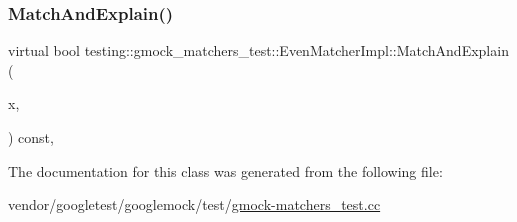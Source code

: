 \subsubsection{\texorpdfstring{Match\+And\+Explain()}{MatchAndExplain()}}
{\footnotesize\ttfamily virtual bool testing\+::gmock\+\_\+matchers\+\_\+test\+::\+Even\+Matcher\+Impl\+::\+Match\+And\+Explain (\begin{DoxyParamCaption}\item[{int}]{x,  }\item[{\hyperlink{classtesting_1_1_match_result_listener}{Match\+Result\+Listener} $\ast$}]{ }\end{DoxyParamCaption}) const\hspace{0.3cm}{\ttfamily [inline]}, {\ttfamily [virtual]}}



The documentation for this class was generated from the following file\+:\begin{DoxyCompactItemize}
\item 
vendor/googletest/googlemock/test/\hyperlink{gmock-matchers__test_8cc}{gmock-\/matchers\+\_\+test.\+cc}\end{DoxyCompactItemize}
